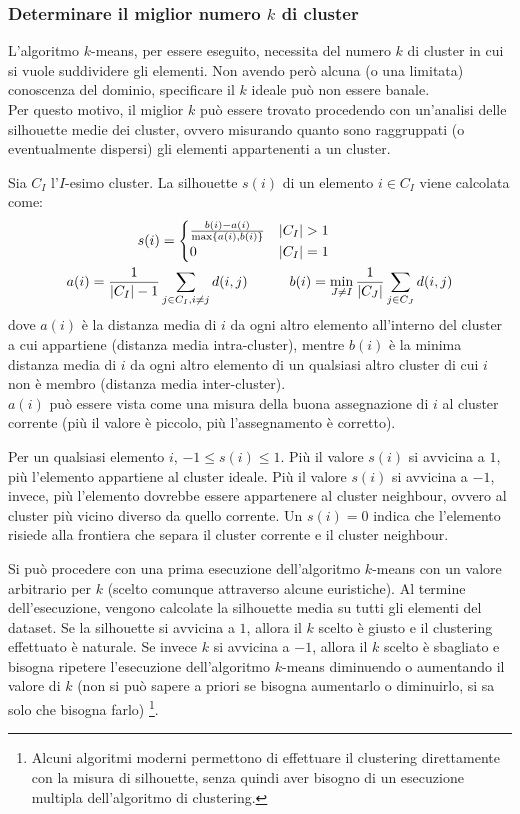 \subsubsection{Determinare il miglior numero $k$ di cluster}
L'algoritmo $k$-means, per essere eseguito, necessita del numero $k$ di cluster in cui si vuole suddividere gli elementi.
Non avendo però alcuna (o una limitata) conoscenza del dominio, specificare il $k$ ideale può non essere banale.\\
Per questo motivo, il miglior $k$ può essere trovato procedendo con un'analisi delle silhouette medie dei cluster, ovvero misurando quanto sono raggruppati (o eventualmente dispersi) gli elementi appartenenti a un cluster.

Sia $C_I$ l'$I$-esimo cluster. La silhouette $s(i)$ di un elemento $i \in C_I$ viene calcolata come:
\begin{align*}
    s(i) &= \begin{cases}
        \frac{b(i)-a(i)}{\max\left\{a(i),b(i)\right\}} & |C_I| > 1\\
        0 & |C_I| = 1
    \end{cases}\\
    a(i) = \frac{1}{|C_I| - 1} &\sum\limits_{j \in C_I, i \neq j} d(i, j) \quad \quad \quad
    b(i) = \min\limits_{J \neq I} \frac{1}{|C_J|} \sum\limits_{j \in C_J} d(i,j)
\end{align*}
dove $a(i)$ è la distanza media di $i$ da ogni altro elemento all'interno del cluster a cui appartiene (distanza media intra-cluster), mentre $b(i)$ è la minima distanza media di $i$ da ogni altro elemento di un qualsiasi altro cluster di cui $i$ non è membro (distanza media inter-cluster).\\
$a(i)$ può essere vista come una misura della buona assegnazione di $i$ al cluster corrente (più il valore è piccolo, più l'assegnamento è corretto).

Per un qualsiasi elemento $i$, $-1 \le s(i) \le 1$. Più il valore $s(i)$ si avvicina a $1$, più l'elemento appartiene al cluster ideale. Più il valore $s(i)$ si avvicina a $-1$, invece, più l'elemento dovrebbe essere appartenere al cluster neighbour, ovvero al cluster più vicino diverso da quello corrente. Un $s(i) = 0$ indica che l'elemento risiede alla frontiera che separa il cluster corrente e il cluster neighbour. 

Si può procedere con una prima esecuzione dell'algoritmo $k$-means con un valore arbitrario per $k$ (scelto comunque attraverso alcune euristiche).
Al termine dell'esecuzione, vengono calcolate la silhouette media su tutti gli elementi del dataset. Se la silhouette si avvicina a $1$, allora il $k$ scelto è giusto e il clustering effettuato è naturale.
Se invece $k$ si avvicina a $-1$, allora il $k$ scelto è sbagliato e bisogna ripetere l'esecuzione dell'algoritmo $k$-means diminuendo o aumentando il valore di $k$ (non si può sapere a priori se bisogna aumentarlo o diminuirlo, si sa solo che bisogna farlo) \footnote{Alcuni algoritmi moderni permettono di effettuare il clustering direttamente con la misura di silhouette, senza quindi aver bisogno di un esecuzione multipla dell'algoritmo di clustering.}.


